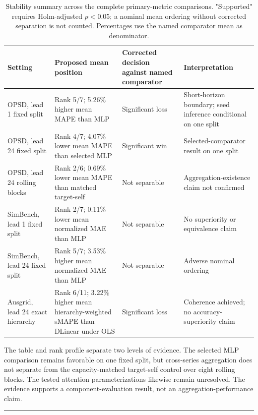 \documentclass[electronics,article,submit,moreauthors]{Definitions/mdpi}
\begin{document}
\begin{table}[t]
\centering
\footnotesize
\setlength{\tabcolsep}{3pt}
\caption{Stability summary across the complete primary-metric comparisons. "Supported" requires Holm-adjusted $p<0.05$; a nominal mean ordering without corrected separation is not counted. Percentages use the named comparator mean as denominator.}\label{tab:7}
\begin{tabularx}{\textwidth}{@{}>{\raggedright\arraybackslash}X >{\raggedright\arraybackslash}X >{\raggedright\arraybackslash}X >{\raggedright\arraybackslash}X@{}}
\toprule
Setting & Proposed mean position & Corrected decision against named comparator & Interpretation \\
\midrule
OPSD, lead 1 fixed split & Rank 5/7; 5.26\% higher mean MAPE than MLP & Significant loss & Short-horizon boundary; seed inference conditional on one split \\
OPSD, lead 24 fixed split & Rank 4/7; 4.07\% lower mean MAPE than selected MLP & Significant win & Selected-comparator result on one split \\
OPSD, lead 24 rolling blocks & Rank 2/6; 0.69\% lower mean MAPE than matched target-self & Not separable & Aggregation-existence claim not confirmed \\
SimBench, lead 1 fixed split & Rank 2/7; 0.11\% lower mean normalized MAE than MLP & Not separable & No superiority or equivalence claim \\
SimBench, lead 24 fixed split & Rank 5/7; 3.53\% higher mean normalized MAE than MLP & Not separable & Adverse nominal ordering \\
Ausgrid, lead 24 exact hierarchy & Rank 6/11; 3.22\% higher mean hierarchy-weighted sMAPE than DLinear under OLS & Significant loss & Coherence achieved; no accuracy-superiority claim \\
\bottomrule
\end{tabularx}
\end{table}

The table and rank profile separate two levels of evidence. The selected MLP comparison remains favorable on one fixed split, but cross-series aggregation does not separate from the capacity-matched target-self control over eight rolling blocks. The tested attention parameterizations likewise remain unresolved. The evidence supports a component-evaluation result, not an aggregation-performance claim.

\begin{center}\rule{0.5\linewidth}{0.5pt}\end{center}
\end{document}
